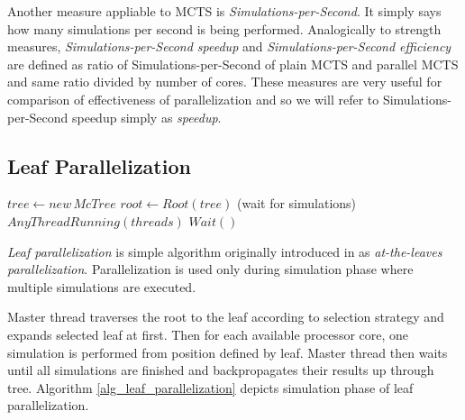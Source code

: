 Another measure appliable to MCTS is \emph{Simulations-per-Second}. It simply says how many
simulations per second is being performed. Analogically to strength measures,
\emph{Simulations-per-Second speedup} and \emph{Simulations-per-Second efficiency} are defined
as ratio of Simulations-per-Second of plain MCTS and parallel MCTS and same ratio divided by
number of cores. These measures are very useful for comparison of effectiveness of
parallelization and so we will refer to Simulations-per-Second speedup simply as
\emph{speedup}. 





\subsection{Leaf Parallelization}
\label{sec_leaf_parallelization}

\begin{algorithm}
\DontPrintSemicolon
\caption{$LeafParallelizationPlayouts(node)$}
\label{alg_leaf_parallelization}

$tree \leftarrow new\,McTree$ \;
$root \leftarrow Root(tree)$\;
\While(wait for simulations){$AnyThreadRunning(threads)$}{
    $Wait()$\;
}
\end{algorithm}

\emph{Leaf parallelization} is simple algorithm originally introduced in \cite{Cazenave2007} as
\emph{at-the-leaves parallelization}. Parallelization is used only during simulation phase where
multiple simulations are executed. 

Master thread traverses the root to the leaf according to selection strategy and expands selected
leaf at first. Then for each available processor core, one simulation is performed from position
defined by leaf. Master thread then waits until all simulations are finished and backpropagates
their results up through tree. Algorithm \ref{alg_leaf_parallelization} depicts simulation phase 
of leaf parallelization. 

